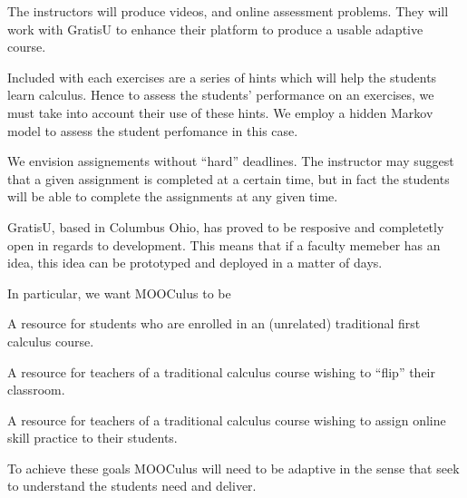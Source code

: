 
The instructors will produce videos, and online assessment
problems. They will work with GratisU to enhance their platform to
produce a usable adaptive course. 



Included with each exercises are a series of hints which will help the
students learn calculus.  Hence to assess the students' performance on
an exercises, we must take into account their use of these hints. We
employ a hidden Markov model to assess the student perfomance in this
case.



We envision assignements without ``hard'' deadlines. The instructor
may suggest that a given assignment is completed at a certain time,
but in fact the students will be able to complete the assignments at
any given time.



GratisU, based in Columbus Ohio, has proved to be resposive and
completetly open in regards to development. This means that if a
faculty memeber has an idea, this idea can be prototyped and deployed
in a matter of days.


 In particular, we want
MOOCulus to be

A resource for students who are enrolled in an (unrelated) traditional first
calculus course.

A resource for teachers of a traditional calculus course wishing to ``flip''
their classroom.

A resource for teachers of a traditional calculus course wishing to assign
online skill practice to their students.

To achieve these goals MOOCulus will need to be adaptive in the sense that
seek to understand the students need and deliver.








